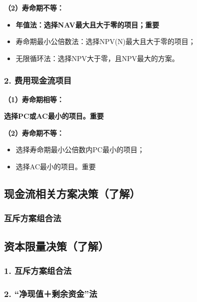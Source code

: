 \textbf{（2）寿命期不等：}
\begin{itemize}
    \item \textbf{年值法：选择NAV最大且大于零的项目；重要}
    \item 寿命期最小公倍数法：选择NPV(N)最大且大于零的项目；
    \item 无限循环法：选择NPV大于零，且NPV最大的方案。
\end{itemize}

\subsubsection{2. 费用现金流项目}
\textbf{（1）寿命期相等：}

\textbf{选择PC或AC最小的项目。重要}

\textbf{（2）寿命期不等：}
\begin{itemize}
    \item 选择寿命期最小公倍数内PC最小的项目；
    \item 选择AC最小的项目。重要
\end{itemize}

\subsection{现金流相关方案决策（了解）}
\subsubsection{互斥方案组合法}
\subsection{资本限量决策（了解）}
\subsubsection{1. 互斥方案组合法}
\subsubsection{2. “净现值＋剩余资金”法}